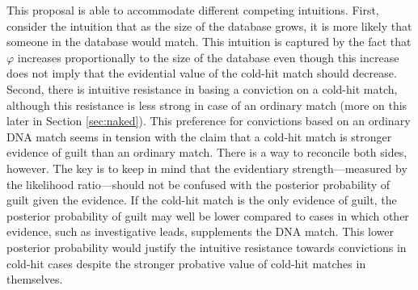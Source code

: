 \documentclass{article}
\begin{document}
This proposal is able to accommodate different competing intuitions. First, consider the intuition that as the size of the database grows, it is more likely that someone in the database would match. This intuition is captured by the fact that $\varphi$ increases proportionally to the size of the database even though this increase does not imply that the evidential value of the cold-hit match should  decrease. Second, there is intuitive resistance in basing a conviction on a cold-hit match, although this resistance is less strong 
in case of an ordinary match (more on this later in Section \ref{sec:naked}). This preference for convictions based on an ordinary DNA match seems in tension with the claim that a cold-hit match is stronger evidence of guilt than an ordinary match. There is a way to reconcile both sides, however. The key is to keep in mind that the evidentiary strength---measured by the likelihood ratio---should not be confused with the posterior probability of guilt given the evidence. 
If the cold-hit match is the only evidence of guilt, the posterior probability of guilt may well be lower compared to cases in which other evidence, such as investigative leads, supplements the DNA match. This lower posterior probability would justify the intuitive resistance towards convictions in 
cold-hit cases  despite the stronger probative value of cold-hit matches in themselves. 








\end{document}

